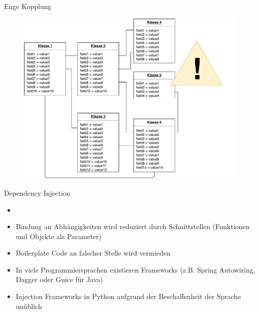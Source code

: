 \begin{frame}{Enge Kopplung}
    	  \begin{figure}[!htb]
        \includegraphics[scale=0.5]{6-python3/img/tightcoupling}  %
    \end{figure}
\end{frame}


\begin{frame}{Dependency Injection}
 \begin{itemize}
        \setlength{\itemindent}{1.3in}
        \item [\textbf{Dependency Injection}]
    \end{itemize}

    \begin{itemize}
        \item Bindung an Abhängigkeiten wird reduziert durch Schnittstellen (Funktionen und Objekte als Parameter)
        \item Boilerplate Code an falscher Stelle wird vermieden
        \item In viele Programmiersprachen existieren Frameworks (z.B. Spring Autowiring, Dagger oder Guice für Java) 
        \item Injection Frameworks in Python aufgrund der Beschaffenheit der Sprache unüblich
   \end{itemize}
   
\end{frame}


